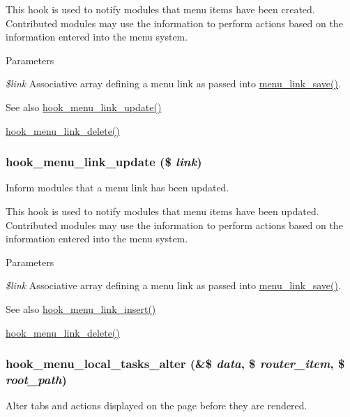This hook is used to notify modules that menu items have been created. Contributed modules may use the information to perform actions based on the information entered into the menu system.


\begin{DoxyParams}{Parameters}
\item[{\em \$link}]Associative array defining a menu link as passed into \hyperlink{group__menu_ga133b177fee00b678a19afba18fb81ebc}{menu\_\-link\_\-save()}.\end{DoxyParams}
\begin{DoxySeeAlso}{See also}
\hyperlink{group__hooks_gafd2d5cc2a49cf37a637201eb76a41d1d}{hook\_\-menu\_\-link\_\-update()} 

\hyperlink{group__hooks_gaf08037b21bd31aa8d2b12e988da7e2fb}{hook\_\-menu\_\-link\_\-delete()} 
\end{DoxySeeAlso}
\hypertarget{group__hooks_gafd2d5cc2a49cf37a637201eb76a41d1d}{
\subsubsection[{hook\_\-menu\_\-link\_\-update}]{\setlength{\rightskip}{0pt plus 5cm}hook\_\-menu\_\-link\_\-update (\$ {\em link})}}
\label{group__hooks_gafd2d5cc2a49cf37a637201eb76a41d1d}
Inform modules that a menu link has been updated.

This hook is used to notify modules that menu items have been updated. Contributed modules may use the information to perform actions based on the information entered into the menu system.


\begin{DoxyParams}{Parameters}
\item[{\em \$link}]Associative array defining a menu link as passed into \hyperlink{group__menu_ga133b177fee00b678a19afba18fb81ebc}{menu\_\-link\_\-save()}.\end{DoxyParams}
\begin{DoxySeeAlso}{See also}
\hyperlink{group__hooks_ga834a576b88ca7a08ce1244469fabb116}{hook\_\-menu\_\-link\_\-insert()} 

\hyperlink{group__hooks_gaf08037b21bd31aa8d2b12e988da7e2fb}{hook\_\-menu\_\-link\_\-delete()} 
\end{DoxySeeAlso}
\hypertarget{group__hooks_gac828fb6b28f1a8bb01c444a9b2331f5f}{
\subsubsection[{hook\_\-menu\_\-local\_\-tasks\_\-alter}]{\setlength{\rightskip}{0pt plus 5cm}hook\_\-menu\_\-local\_\-tasks\_\-alter (\&\$ {\em data}, \/  \$ {\em router\_\-item}, \/  \$ {\em root\_\-path})}}
\label{group__hooks_gac828fb6b28f1a8bb01c444a9b2331f5f}
Alter tabs and actions displayed on the page before they are rendered.

